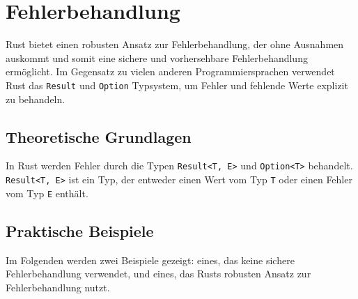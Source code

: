 \chapter{Fehlerbehandlung}
Rust bietet einen robusten Ansatz zur Fehlerbehandlung, der ohne Ausnahmen auskommt und somit eine sichere und vorhersehbare Fehlerbehandlung ermöglicht. 
Im Gegensatz zu vielen anderen Programmiersprachen verwendet Rust das \texttt{Result} und \texttt{Option} Typsystem, um Fehler und fehlende Werte explizit zu behandeln.

\section{Theoretische Grundlagen}
In Rust werden Fehler durch die Typen \texttt{Result<T, E>} und \texttt{Option<T>} behandelt. 
\texttt{Result<T, E>} ist ein Typ, der entweder einen Wert vom Typ \texttt{T} oder einen Fehler vom Typ \texttt{E} enthält. 

\section{Praktische Beispiele}
Im Folgenden werden zwei Beispiele gezeigt: eines, das keine sichere Fehlerbehandlung verwendet, und eines, das Rusts robusten Ansatz zur Fehlerbehandlung nutzt.

